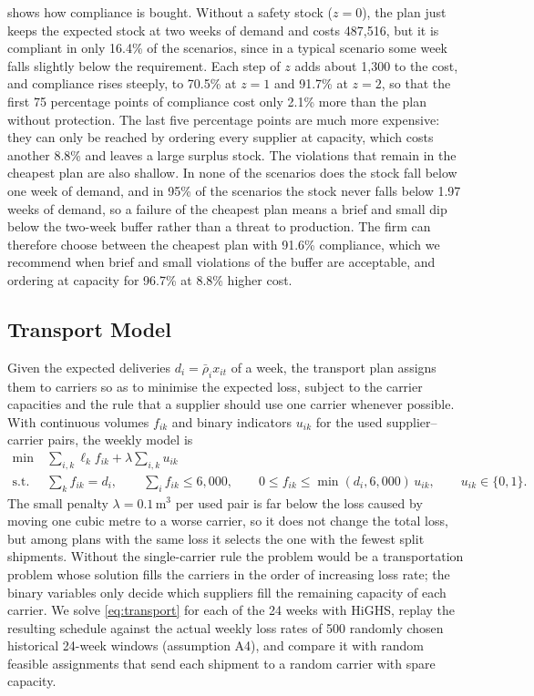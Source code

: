 \documentclass[11pt,a4paper]{article}
\begin{document}
 shows how compliance is bought.
Without a safety stock ($z=0$), the plan just keeps the expected stock at two weeks of demand and costs 487{,}516, but it is compliant in only 16.4\% of the scenarios, since in a typical scenario some week falls slightly below the requirement.
Each step of $z$ adds about 1{,}300 to the cost, and compliance rises steeply, to 70.5\% at $z=1$ and 91.7\% at $z=2$, so that the first 75 percentage points of compliance cost only 2.1\% more than the plan without protection.
The last five percentage points are much more expensive: they can only be reached by ordering every supplier at capacity, which costs another 8.8\% and leaves a large surplus stock.
The violations that remain in the cheapest plan are also shallow.
In none of the scenarios does the stock fall below one week of demand, and in 95\% of the scenarios the stock never falls below 1.97 weeks of demand, so a failure of the cheapest plan means a brief and small dip below the two-week buffer rather than a threat to production.
The firm can therefore choose between the cheapest plan with 91.6\% compliance, which we recommend when brief and small violations of the buffer are acceptable, and ordering at capacity for 96.7\% at 8.8\% higher cost.

\subsection{Transport Model}
Given the expected deliveries $d_i=\bar\rho_i x_{it}$ of a week, the transport plan assigns them to carriers so as to minimise the expected loss, subject to the carrier capacities and the rule that a supplier should use one carrier whenever possible.
With continuous volumes $f_{ik}$ and binary indicators $u_{ik}$ for the used supplier--carrier pairs, the weekly model is
\begin{equation}\label{eq:transport}
\begin{aligned}
\min\ & \sum_{i,k}\ell_k f_{ik} + \lambda\sum_{i,k}u_{ik}\\
\text{s.t.}\ & \sum_k f_{ik}=d_i, \qquad \sum_i f_{ik}\le 6{,}000, \qquad 0\le f_{ik}\le\min(d_i,6{,}000)\,u_{ik}, \qquad u_{ik}\in\{0,1\}.
\end{aligned}
\end{equation}
The small penalty $\lambda=0.1$\,m$^3$ per used pair is far below the loss caused by moving one cubic metre to a worse carrier, so it does not change the total loss, but among plans with the same loss it selects the one with the fewest split shipments.
Without the single-carrier rule the problem would be a transportation problem whose solution fills the carriers in the order of increasing loss rate; the binary variables only decide which suppliers fill the remaining capacity of each carrier.
We solve \cref{eq:transport} for each of the 24 weeks with HiGHS, replay the resulting schedule against the actual weekly loss rates of 500 randomly chosen historical 24-week windows (assumption A4), and compare it with random feasible assignments that send each shipment to a random carrier with spare capacity.
\end{document}
